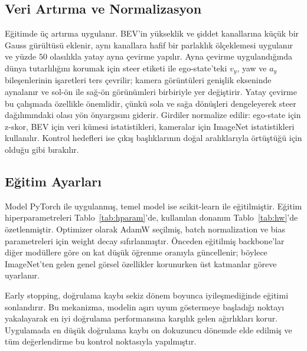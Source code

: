 \documentclass[conference]{IEEEtran}
\begin{document}
\subsection{Veri Artırma ve Normalizasyon}

Eğitimde üç artırma uygulanır. BEV'in yükseklik ve şiddet kanallarına küçük bir Gauss gürültüsü eklenir, aynı kanallara hafif bir parlaklık ölçeklemesi uygulanır ve yüzde $50$ olasılıkla yatay ayna çevirme yapılır. Ayna çevirme uygulandığında dünya tutarlılığını korumak için steer etiketi ile ego-state'teki $v_y$, yaw ve $a_y$ bileşenlerinin işaretleri ters çevrilir; kamera görüntüleri genişlik ekseninde aynalanır ve sol-ön ile sağ-ön görünümleri birbiriyle yer değiştirir. Yatay çevirme bu çalışmada özellikle önemlidir, çünkü sola ve sağa dönüşleri dengeleyerek steer dağılımındaki olası yön önyargısını giderir. Girdiler normalize edilir: ego-state için z-skor, BEV için veri kümesi istatistikleri, kameralar için ImageNet istatistikleri kullanılır. Kontrol hedefleri ise çıkış başlıklarının doğal aralıklarıyla örtüştüğü için olduğu gibi bırakılır.

\subsection{Eğitim Ayarları}

Model PyTorch \cite{Paszke19PyTorch} ile uygulanmış, temel model ise scikit-learn \cite{Pedregosa11Sklearn} ile eğitilmiştir. Eğitim hiperparametreleri Tablo~\ref{tab:hparam}'de, kullanılan donanım Tablo~\ref{tab:hw}'de özetlenmiştir. Optimizer olarak AdamW \cite{Loshchilov19AdamW} seçilmiş, batch normalization ve bias parametreleri için weight decay sıfırlanmıştır. Önceden eğitilmiş backbone'lar diğer modüllere göre on kat düşük öğrenme oranıyla güncellenir; böylece ImageNet'ten gelen genel görsel özellikler korunurken üst katmanlar göreve uyarlanır.

Early stopping, doğrulama kaybı sekiz dönem boyunca iyileşmediğinde eğitimi sonlandırır. Bu mekanizma, modelin aşırı uyum göstermeye başladığı noktayı yakalayarak en iyi doğrulama performansına karşılık gelen ağırlıkları korur. Uygulamada en düşük doğrulama kaybı on dokuzuncu dönemde elde edilmiş ve tüm değerlendirme bu kontrol noktasıyla yapılmıştır.
\end{document}
